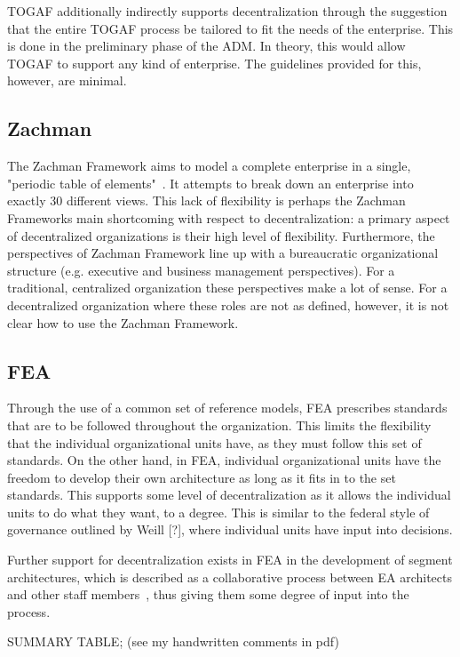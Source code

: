
TOGAF additionally indirectly supports decentralization through the suggestion that the entire TOGAF process be tailored to fit the needs of the enterprise. This is done in the preliminary phase of the ADM. In theory, this would allow TOGAF to support any kind of enterprise. The guidelines provided for this, however, are minimal. 

\subsection{Zachman}
The Zachman Framework aims to model a complete enterprise in a single, "periodic table of elements"~\cite{Bente2012}. It attempts to break down an enterprise into exactly 30 different views. This lack of flexibility is perhaps the Zachman Frameworks main shortcoming with respect to decentralization: a primary aspect of decentralized organizations is their high level of flexibility. Furthermore, the perspectives of Zachman Framework line up with a bureaucratic organizational structure (e.g. executive and business management perspectives). For a traditional, centralized organization these perspectives make a lot of sense. For a decentralized organization where these roles are not as defined, however, it is not clear how to use the Zachman Framework. 

\subsection{FEA}

Through the use of a common set of reference models, FEA prescribes standards that are to be followed throughout the organization. This limits the flexibility that the individual organizational units have, as they must follow this set of standards. On the other hand, in FEA, individual organizational units have the freedom to develop their own architecture as long as it fits in to the set standards. This supports some level of decentralization as it allows the individual units to do what they want, to a degree. This is similar to the federal style of governance outlined by Weill [?], where individual units have input into decisions. 

Further support for decentralization exists in FEA in the development of segment architectures, which is described as a collaborative process between EA architects and other staff members~\cite{FederalEnterpriseArchitectureProgramManagementOffice2007}, thus giving them some degree of input into the process. 

SUMMARY TABLE;
(see my handwritten comments in pdf)
